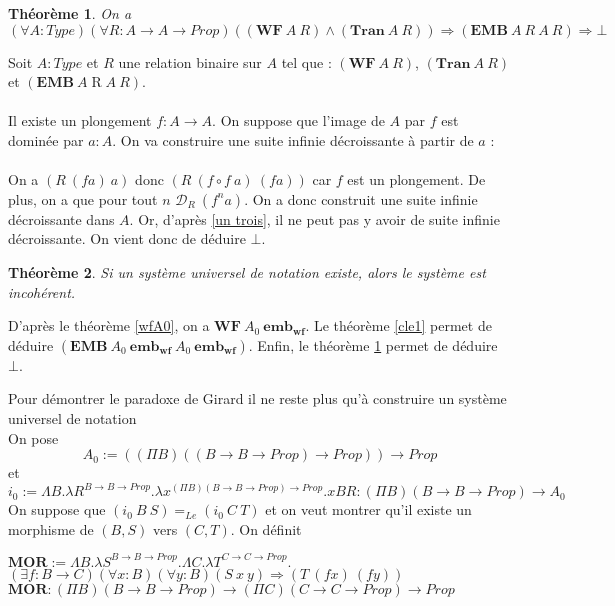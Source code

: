 \documentclass[a4paper,12pt]{article}
\theoremstyle{plain}
\newtheorem{theo}{Théorème}[subsection]
\newenvironment{demo}[1][]
 {\if\relax\detokenize{#1}\relax
    \renewcommand\theproofinner{\thetheo}%
  \else
    \renewcommand{\theproofinner}{#1}%
  \fi
  \proofinner}
 {\endproofinner}
\begin{document}
\begin{theo}
\label{cle2}
On a $$(\forall A : \mathit{Type})( \forall R: A \to A \to \mathit{Prop}) ((\mathbf{WF}\ A \ R)\land(\mathbf{Tran} \ A \ R)) \Rightarrow(\mathbf{EMB}\ A \ R\ A \ R) \Rightarrow\bot$$
\end{theo}

\begin{demo} Soit $A : \mathit{Type}$ et $R$ une relation binaire sur $A$ tel que : $(\mathbf{WF}\ A \ R)$, $(\mathbf{Tran} \ A \ R)$ et $(\mathbf{EMB}\ A \mathbin{R} A \ R)$.\\
\\ 
Il existe un plongement $f : A \to A$. On suppose que l'image de $A$ par $f$ est dominée par $a : A$. On va construire une suite infinie décroissante à partir de $a$ :\\
\\ 
On a $(R \ (fa) \ a)$ donc $(R \ (f{\circ}f \ a) \ (fa))$ car $f$ est un plongement. De plus, on a que pour tout $n$ $\mathcal{D}_R \ (f^n a)$. On a donc construit une suite infinie décroissante dans $A$. Or, d'après \ref{un trois}, il ne peut pas y avoir de suite infinie décroissante. On vient donc de déduire $\bot$. 
\end{demo}

\begin{theo}
Si un système universel de notation existe, alors le système est incohérent.
\end{theo}

\begin{demo} D'après le théorème \ref{wfA0}, on a $\mathbf{WF}\ A_0 \ \mathbf{{emb}_{wf}}$. Le théorème \ref{cle1} permet de déduire $(\mathbf{EMB}\ A_0 \ \mathbf{{emb}_{wf}}\ A_0 \ \mathbf{{emb}_{wf}})$. Enfin, le théorème \ref{cle2} permet de déduire $\bot$.
\end{demo}

Pour démontrer le paradoxe de Girard il ne reste plus qu'à construire un système universel de notation \\ 
On pose
$$A_0 := ((\Pi B)((B \to B \to \mathit{Prop}) \to \mathit{Prop})) \to \mathit{Prop}$$
et
$$i_0 := \Lambda B. \lambda R^{B \to B \to \mathit{Prop}}.\lambda x^{(\Pi B)(B \to B \to \mathit{Prop}) \to \mathit{Prop}}.xBR : (\Pi B)(B \to B \to \mathit{Prop}) \to A_0$$
On suppose que $(i_0 \ B \ S) =_{\mathit{Le}}(i_0 \ C \ T)$ et on veut montrer qu'il existe un morphisme de $(B,S)$ vers $(C,T)$. On définit

\begin{center}
$\mathbf{MOR} := \Lambda B. \lambda S^{B \to B \to \mathit{Prop}}.\Lambda C. \lambda T^{C \to C \to \mathit{Prop}}.$\\[3mm]
$(\exists f: B \to C)(\forall x:B) (\forall y : B) (S \ x \ y) \Rightarrow(T \ (fx) \ (fy))$\\[3mm]
$ \mathbf{MOR} : (\Pi B)(B \to B \to \mathit{Prop}) \to (\Pi C)(C \to C \to \mathit{Prop}) \to \mathit{Prop}$
\end{center}
\vspace{4mm}
\end{document}
